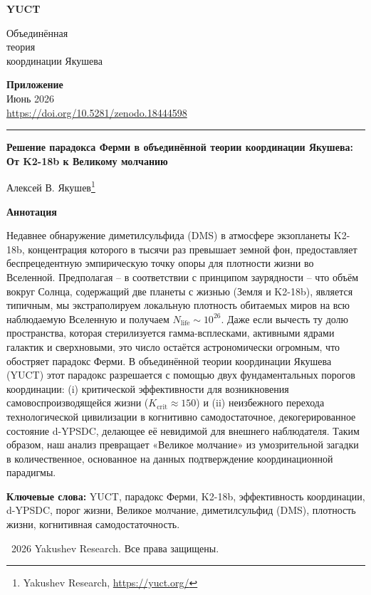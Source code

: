 \documentclass[11pt,a4paper]{article}
\newcommand{\makeheader}{%
	\noindent
	\begin{minipage}{0.17\textwidth}
		\raggedright
		{\sffamily\bfseries\color{skyblue}\fontsize{46}{46}\selectfont YUCT}%
	\end{minipage}%
	\hspace{30pt}
	\begin{minipage}{0.32\textwidth}
		\raggedright
		{\sffamily\fontsize{11}{13}\selectfont Объединённая\\ теория\\ координации Якушева}%
	\end{minipage}%
	\hfill
	\begin{minipage}{0.38\textwidth}
		\raggedleft
		{\sffamily\bfseries Приложение}\\
		{\sffamily Июнь 2026}\\
		{\sffamily\footnotesize \url{https://doi.org/10.5281/zenodo.18444598}}%
	\end{minipage}
	\par\vspace{5pt}
	\noindent\textcolor{gold}{\rule{\textwidth}{1.6pt}}
	\par\vspace{0pt}
}
\begin{document}
	\renewcommand{\thepage}{\arabic{page}}
	\thispagestyle{firstpage}
	\makeheader
	
	\vspace{0cm}
	{\LARGE\bfseries Решение парадокса Ферми в объединённой теории координации Якушева:\\ От K2-18b к Великому молчанию \par}
	\vspace{0.2cm}
	
	{\large Алексей В. Якушев\footnote{Yakushev Research, \url{https://yuct.org/}}} \\
	\vspace{0.0cm}
	
	{\color{darkblue}\textbf{\LARGE Аннотация}} \par
	{\large
		\noindent
		Недавнее обнаружение диметилсульфида (DMS) в атмосфере экзопланеты K2-18b, концентрация которого в тысячи раз превышает земной фон, предоставляет беспрецедентную эмпирическую точку опоры для плотности жизни во Вселенной. Предполагая – в соответствии с принципом заурядности – что объём вокруг Солнца, содержащий две планеты с жизнью (Земля и K2-18b), является типичным, мы экстраполируем локальную плотность обитаемых миров на всю наблюдаемую Вселенную и получаем \(N_{\mathrm{life}} \sim 10^{26}\). Даже если вычесть ту долю пространства, которая стерилизуется гамма-всплесками, активными ядрами галактик и сверхновыми, это число остаётся астрономически огромным, что обостряет парадокс Ферми. В объединённой теории координации Якушева (YUCT) этот парадокс разрешается с помощью двух фундаментальных порогов координации: (i) критической эффективности для возникновения самовоспроизводящейся жизни (\(K_{\mathrm{crit}}\approx150\)) и (ii) неизбежного перехода технологической цивилизации в когнитивно самодостаточное, декогерированное состояние d-YPSDC, делающее её невидимой для внешнего наблюдателя. Таким образом, наш анализ превращает «Великое молчание» из умозрительной загадки в количественное, основанное на данных подтверждение координационной парадигмы.
	}
	
	\vspace{0.1cm}
	\noindent
	{\color{darkblue}\textbf{Ключевые слова:}} YUCT, парадокс Ферми, K2-18b, эффективность координации, d-YPSDC, порог жизни, Великое молчание, диметилсульфид (DMS), плотность жизни, когнитивная самодостаточность.
	
	\vspace{0.5cm}
	\noindent
	\textcopyright\ 2026 Yakushev Research. Все права защищены.
	
\end{document}
